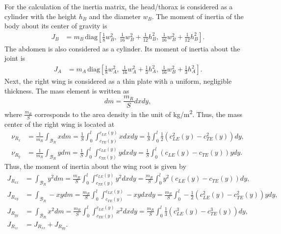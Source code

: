 \documentclass[conf]{new-aiaa}
\begin{document}
For the calculation of the inertia matrix, the head/thorax is considered as a cylinder with the height $h_B$ and the diameter $w_B$.
The moment of inertia of the body about its center of gravity is 
\begin{align*}
    J_B & = m_B\, \mathrm{diag} [ \frac{1}{8} w_B^2 , \; \frac{1}{16}w_B^2 + \frac{1}{12}h_B^2, \; \frac{1}{16}w_B^2 + \frac{1}{12} h_B^2] .
\end{align*}
The abdomen is also considered as a cylinder. 
Its moment of inertia about the joint is
\begin{align*}
    J_A & = m_A\, \mathrm{diag} [ \frac{1}{8} w_A^2 ,\;  \frac{1}{16}w_A^2 + \frac{1}{3}h_A^2, \; \frac{1}{16}w_B^2 + \frac{1}{3} h_A^2].
\end{align*}
Next, the right wing is considered as a thin plate with a uniform, negligible thickness. 
The mass element is written as
\[
    dm = \frac{m_R}{S} dx dy,
\]
where $\frac{m_R}{S}$ corresponds to the area density in the unit of \si{kg/m^2}.
Thus, the mass center of the right wing is located at
\begin{align*}
    \nu_{R_x} & = \frac{1}{m_R} \int_{\mathcal{B}_R} x  dm
                = \frac{1}{S} \int_{0}^l \int_{c_{TE}(y)}^{c_{LE}(y)} x dx dy
                = \frac{1}{S} \int_0^l \frac{1}{2}(c_{LE}^2(y)-c_{TE}^2(y)) dy,\\
    \nu_{R_y} & = \frac{1}{m_R} \int_{\mathcal{B}_R} y  dm
                = \frac{1}{S} \int_{0}^l \int_{c_{TE}(y)}^{c_{LE}(y)} y dx dy
                = \frac{1}{S} \int_0^l (c_{LE}(y)-c_{TE}(y))y dy.
\end{align*}
Thus, the moment of inertia about the wing root is given by
\begin{align*}
    J_{R_{xx}} & = \int_{\mathcal{B}_R} y^2 dm 
                = \frac{m_R}{S} \int_{0}^l \int_{c_{TE}(y)}^{c_{LE}(y)} y^2 dx dy
                = \frac{m_R}{S} \int_0^l y^2(c_{LE}(y)-c_{TE}(y)) dy,\\
    J_{R_{xy}} & = \int_{\mathcal{B}_R} -x y dm 
                = \frac{m_R}{S} \int_{0}^l \int_{c_{TE}(y)}^{c_{LE}(y)} -xy dx  dy
                = \frac{m_R}{S} \int_0^l -\frac{1}{2}(c_{LE}^2(y)-c_{TE}^2(y))y dy,\\
    J_{R_{yy}} & = \int_{\mathcal{B}_R} x^2 dm 
                = \frac{m_R}{S} \int_{0}^l \int_{c_{TE}(y)}^{c_{LE}(y)} x^2 dx  dy
                = \frac{m_R}{S} \int_0^l \frac{1}{3}(c_{LE}^3(y)-c_{TE}^3(y)) dy,\\
                J_{R_{zz}} & = J_{R_{xx}} + J_{R_{yy}}.
\end{align*}
\end{document}
